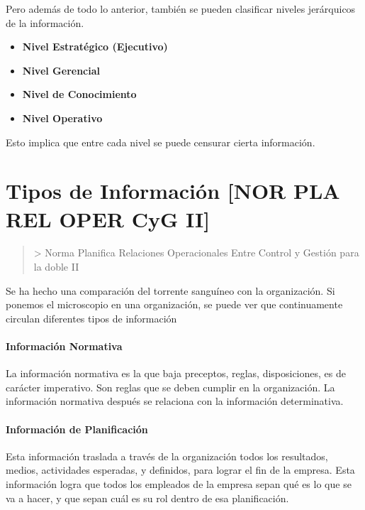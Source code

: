 Pero además de todo lo anterior, también se pueden clasificar niveles
jerárquicos de la información.

\begin{itemize}
  \setlength\itemsep{-1em}
\item  \textbf{Nivel Estratégico (Ejecutivo)}
\item  \textbf{Nivel Gerencial}
\item  \textbf{Nivel de Conocimiento}
\item  \textbf{Nivel Operativo}
\end{itemize}

Esto implica que entre cada nivel se puede censurar cierta información.

\hypertarget{tipos-de-informaciuxf3n}{%
\section{Tipos de Información [NOR PLA REL OPER CyG II]}\label{tipos-de-informaciuxf3n}}

\begin{quote}
\textgreater{} Norma Planifica Relaciones
Operacionales Entre Control y Gestión para la doble II
\end{quote}

Se ha hecho una comparación del torrente sanguíneo con la organización.
Si ponemos el microscopio en una organización, se puede ver que
continuamente circulan diferentes tipos de información

\hypertarget{informaciuxf3n-normativa}{%
\paragraph*{Información Normativa}\label{informaciuxf3n-normativa}}
La información normativa es la que baja preceptos, reglas,
disposiciones, es de carácter imperativo. Son reglas que se deben
cumplir en la organización. La información normativa después se relaciona con la información
determinativa.

\hypertarget{informaciuxf3n-de-planificaciuxf3n}{%
\paragraph*{Información de
Planificación}\label{informaciuxf3n-de-planificaciuxf3n}}
Esta información traslada a través de la organización todos los
resultados, medios, actividades esperadas, y definidos, para lograr el
fin de la empresa. Esta información logra que todos los empleados de la
empresa sepan qué es lo que se va a hacer, y que sepan cuál es su rol
dentro de esa planificación.

